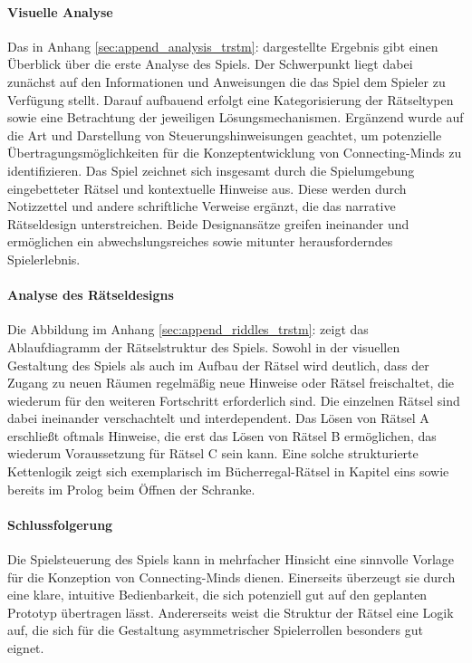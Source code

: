 \paragraph{Visuelle Analyse}
Das in Anhang \ref{sec:append_analysis_trstm}:  dargestellte Ergebnis gibt einen Überblick über die erste Analyse des Spiels. Der Schwerpunkt liegt dabei zunächst auf den Informationen und Anweisungen die das Spiel dem Spieler zu Verfügung stellt. Darauf aufbauend erfolgt eine Kategorisierung der Rätseltypen sowie eine Betrachtung der jeweiligen Lösungsmechanismen. Ergänzend wurde auf die Art und Darstellung von Steuerungshinweisungen geachtet, um potenzielle Übertragungsmöglichkeiten für die Konzeptentwicklung von Connecting-Minds zu identifizieren. Das Spiel zeichnet sich insgesamt durch die Spielumgebung eingebetteter Rätsel und kontextuelle Hinweise aus. Diese werden durch Notizzettel und andere schriftliche Verweise ergänzt, die das narrative Rätseldesign unterstreichen. Beide Designansätze greifen ineinander und ermöglichen ein abwechslungsreiches sowie mitunter herausforderndes Spielerlebnis.

\paragraph{Analyse des Rätseldesigns}
Die Abbildung im Anhang \ref{sec:append_riddles_trstm}:  zeigt das Ablaufdiagramm der Rätselstruktur des Spiels. Sowohl in der visuellen Gestaltung des Spiels als auch im Aufbau der Rätsel wird deutlich, dass der Zugang zu neuen Räumen regelmäßig neue Hinweise oder Rätsel freischaltet, die wiederum für den weiteren Fortschritt erforderlich sind. Die einzelnen Rätsel sind dabei ineinander verschachtelt und interdependent. Das Lösen von Rätsel A erschließt oftmals Hinweise, die erst das Lösen von Rätsel B ermöglichen, das wiederum Voraussetzung für Rätsel C sein kann. Eine solche strukturierte Kettenlogik zeigt sich exemplarisch im Bücherregal-Rätsel in Kapitel eins sowie bereits im Prolog beim Öffnen der Schranke.

\paragraph{Schlussfolgerung}
Die Spielsteuerung des Spiels kann in mehrfacher Hinsicht eine sinnvolle Vorlage für die Konzeption von Connecting-Minds dienen. Einerseits überzeugt sie durch eine klare, intuitive Bedienbarkeit, die sich potenziell gut auf den geplanten Prototyp übertragen lässt. Andererseits weist die Struktur der Rätsel eine Logik auf, die sich für die Gestaltung asymmetrischer Spielerrollen besonders gut eignet.

